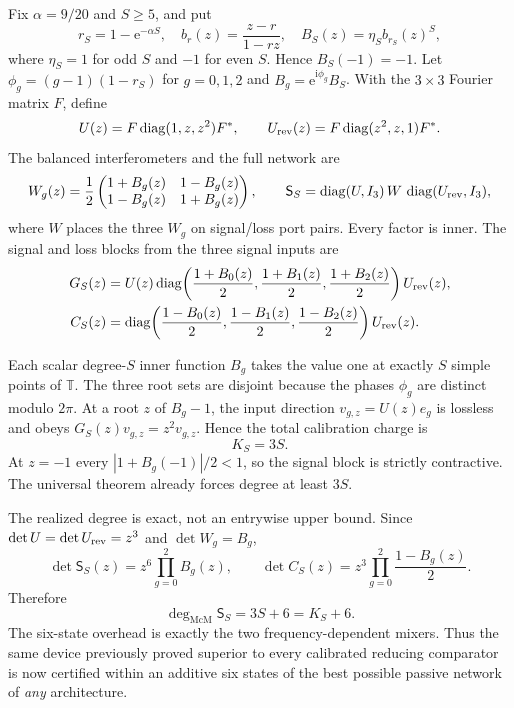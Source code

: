 \documentclass[11pt]{article}
\theoremstyle{definition}
\theoremstyle{remark}
\newcommand{\T}{\mathbb{T}}
\newcommand{\diag}{\operatorname{diag}}
\newcommand{\e}{\mathrm{e}}
\newcommand{\mcdeg}{\deg_{\mathrm{McM}}}
\begin{document}
Fix $\alpha=9/20$ and $S\geq5$, and put
\begin{equation}\label{eq:familyb}
 r_S=1-\e^{-\alpha S},\quad
 b_r(z)=\frac{z-r}{1-rz},\quad
 B_S(z)=\eta_S b_{r_S}(z)^S,
\end{equation}
where $\eta_S=1$ for odd $S$ and $-1$ for even $S$.  Hence $B_S(-1)=-1$.
Let $\phi_g=(g-1)(1-r_S)$ for $g=0,1,2$ and $B_g=\e^{\mathrm{i}\phi_g}B_S$.
With the $3\times3$ Fourier matrix $F$, define
\begin{equation}\label{eq:mixers}
 U(z)=F\diag(1,z,z^2)F^*,\qquad
 U_{\rm rev}(z)=F\diag(z^2,z,1)F^*.
\end{equation}
The balanced interferometers and the full network are
\begin{equation}\label{eq:network}
 W_g(z)=\frac12
 \begin{pmatrix}1+B_g(z)&1-B_g(z)\\1-B_g(z)&1+B_g(z)\end{pmatrix},
 \qquad
 \mathsf S_S=\diag(U,I_3)\,W\,\diag(U_{\rm rev},I_3),
\end{equation}
where $W$ places the three $W_g$ on signal/loss port pairs.  Every factor is
inner.  The signal and loss blocks from the three signal inputs are
\begin{align}
 G_S(z)&=U(z)\diag\!\left(\frac{1+B_0(z)}2,
 \frac{1+B_1(z)}2,\frac{1+B_2(z)}2\right)U_{\rm rev}(z),
 \label{eq:GS}\\
 C_S(z)&=\diag\!\left(\frac{1-B_0(z)}2,
 \frac{1-B_1(z)}2,\frac{1-B_2(z)}2\right)U_{\rm rev}(z).
 \label{eq:CS}
\end{align}

Each scalar degree-$S$ inner function $B_g$ takes the value one at exactly
$S$ simple points of $\T$.  The three root sets are disjoint because the
phases $\phi_g$ are distinct modulo $2\pi$.  At a root $z$ of $B_g-1$, the
input direction $v_{g,z}=U(z)e_g$ is lossless and obeys
$G_S(z)v_{g,z}=z^2v_{g,z}$.  Hence the total calibration charge is
\begin{equation}\label{eq:KS}
 K_S=3S.
\end{equation}
At $z=-1$ every $|1+B_g(-1)|/2<1$, so the signal block is strictly
contractive.  The universal theorem already forces degree at least $3S$.

The realized degree is exact, not an entrywise upper bound.  Since
$\det U=\det U_{\rm rev}=z^3$ and $\det W_g=B_g$,
\begin{equation}\label{eq:dets}
 \det\mathsf S_S(z)=z^6\prod_{g=0}^{2}B_g(z),
 \qquad
 \det C_S(z)=z^3\prod_{g=0}^{2}\frac{1-B_g(z)}2.
\end{equation}
Therefore
\begin{equation}\label{eq:nearoptimal}
 \mcdeg\mathsf S_S=3S+6=K_S+6.
\end{equation}
The six-state overhead is exactly the two frequency-dependent mixers.  Thus
the same device previously proved superior to every calibrated reducing
comparator is now certified within an additive six states of the best
possible passive network of \emph{any} architecture.
\end{document}
